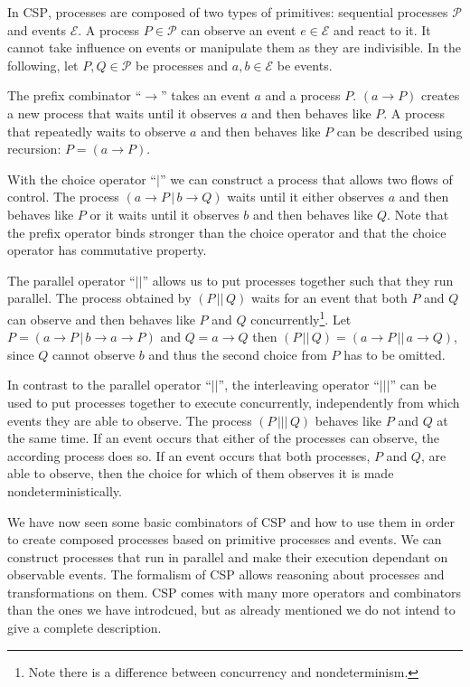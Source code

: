 In \textsc{CSP}, processes are composed of two types of primitives: sequential processes $\mathcal{P}$ and events $\mathcal{E}$. A process $P \in \mathcal{P}$ can observe an event $e \in \mathcal{E}$ and react to it. It cannot take influence on events or manipulate them as they are indivisible. In the following, let $P, Q \in \mathcal{P}$ be processes and $a,b \in \mathcal{E}$ be events.

The prefix combinator \enquote{$\to$} takes an event $a$ and a process $P$. $\left( a \to P \right)$ creates a new process that waits until it observes $a$ and then behaves like $P$. A process that repeatedly waits to observe $a$ and then behaves like $P$ can be described using recursion: $P = \left( a \to P \right)$.

With the choice operator \enquote{$|$} we can construct a process that allows two flows of control. The process $\left( a \to P \,|\, b \to Q \right)$ waits until it either observes $a$ and then behaves like $P$ or it waits until it observes $b$ and then behaves like $Q$. Note that the prefix operator binds stronger than the choice operator and that the choice operator has commutative property.

The parallel operator \enquote{$||$} allows us to put processes together such that they run parallel. The process obtained by $\left( P \,||\, Q \right)$ waits for an event that both $P$ and $Q$ can observe and then behaves like $P$ and $Q$ concurrently\footnote{Note there is a difference between concurrency and nondeterminism.}. Let $P = \left( a \to P \,|\, b \to a \to P \right)$ and $Q = a \to Q$ then $\left( P \,||\, Q \right) = \left( a \to P \,||\, a \to Q \right)$, since $Q$ cannot observe $b$ and thus the second choice from $P$ has to be omitted.

In contrast to the parallel operator \enquote{$||$}, the interleaving operator \enquote{$|||$} can be used to put processes together to execute concurrently, independently from which events they are able to observe. The process $\left( P \,|||\, Q \right)$ behaves like $P$ and $Q$ at the same time. If an event occurs that either of the processes can observe, the according process does so. If an event occurs that both processes, $P$ and $Q$, are able to observe, then the choice for which of them observes it is made nondeterministically.

We have now seen some basic combinators of \textsc{CSP} and how to use them in order to create composed processes based on primitive processes and events. We can construct processes that run in parallel and make their execution dependant on observable events. The formalism of \textsc{CSP} allows reasoning about processes and transformations on them. \textsc{CSP} comes with many more operators and combinators than the ones we have introdcued, but as already mentioned we do not intend to give a complete description.

